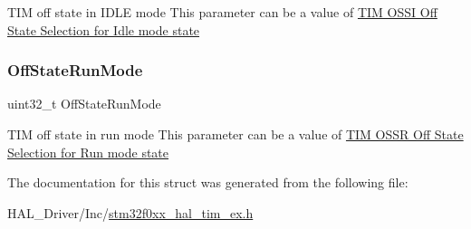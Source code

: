 T\+IM off state in I\+D\+LE mode This parameter can be a value of \hyperlink{group___t_i_m___o_s_s_i___off___state___selection__for___idle__mode__state}{T\+IM O\+S\+SI Off State Selection for Idle mode state} \mbox{\label{struct_t_i_m___break_dead_time_config_type_def_af45695121f3b3fe1ab24e8fbdb56d781}} 
\subsubsection{\texorpdfstring{Off\+State\+Run\+Mode}{OffStateRunMode}}
{\footnotesize\ttfamily uint32\+\_\+t Off\+State\+Run\+Mode}

T\+IM off state in run mode This parameter can be a value of \hyperlink{group___t_i_m___o_s_s_r___off___state___selection__for___run__mode__state}{T\+IM O\+S\+SR Off State Selection for Run mode state} 

The documentation for this struct was generated from the following file\+:\begin{DoxyCompactItemize}
\item 
H\+A\+L\+\_\+\+Driver/\+Inc/\hyperlink{stm32f0xx__hal__tim__ex_8h}{stm32f0xx\+\_\+hal\+\_\+tim\+\_\+ex.\+h}\end{DoxyCompactItemize}
